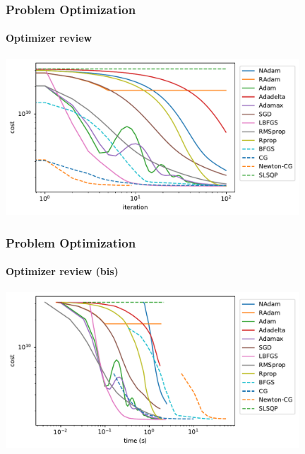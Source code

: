 \documentclass{beamer}
\begin{document}
	\begin{frame}
		\frametitle{Problem Optimization}
		\framesubtitle{Optimizer review}
				
		\includegraphics[width=11cm]{figures/ICMProstate-iter.pdf}
		
	\end{frame}
	
	\begin{frame}
		\frametitle{Problem Optimization}
		\framesubtitle{Optimizer review (bis)}
		
		\includegraphics[width=11cm]{figures/ICMProstate-time.pdf}
	
	\end{frame}
	
\end{document}
